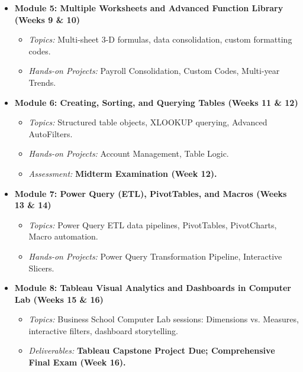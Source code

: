 \documentclass[11pt,a4paper]{article}
\begin{document}
\begin{itemize}[leftmargin=*]
    \item \textbf{Module 5: Multiple Worksheets and Advanced Function Library (Weeks 9 \& 10)}
    \begin{itemize}[noitemsep]
        \item \textit{Topics:} Multi-sheet 3-D formulas, data consolidation, custom formatting codes.
        \item \textit{Hands-on Projects:} Payroll Consolidation, Custom Codes, Multi-year Trends.
    \end{itemize}

    \item \textbf{Module 6: Creating, Sorting, and Querying Tables (Weeks 11 \& 12)}
    \begin{itemize}[noitemsep]
        \item \textit{Topics:} Structured table objects, XLOOKUP querying, Advanced AutoFilters.
        \item \textit{Hands-on Projects:} Account Management, Table Logic.
        \item \textit{Assessment:} \textbf{Midterm Examination (Week 12).}
    \end{itemize}

    \item \textbf{Module 7: Power Query (ETL), PivotTables, and Macros (Weeks 13 \& 14)}
    \begin{itemize}[noitemsep]
        \item \textit{Topics:} Power Query ETL data pipelines, PivotTables, PivotCharts, Macro automation.
        \item \textit{Hands-on Projects:} Power Query Transformation Pipeline, Interactive Slicers.
    \end{itemize}

    \item \textbf{Module 8: Tableau Visual Analytics and Dashboards in Computer Lab (Weeks 15 \& 16)}
    \begin{itemize}[noitemsep]
        \item \textit{Topics:} Business School Computer Lab sessions: Dimensions vs. Measures, interactive filters, dashboard storytelling.
        \item \textit{Deliverables:} \textbf{Tableau Capstone Project Due; Comprehensive Final Exam (Week 16).}
    \end{itemize}
\end{itemize}
\end{document}
